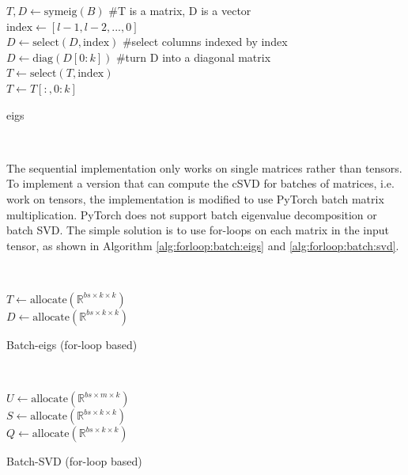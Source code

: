 \begin{algorithm}[H]
\SetAlgoLined
{}
$T,D \gets \mathrm{symeig}(B)$ \#T is a matrix, D is a vector \\
$\mathrm{index} \gets [l-1, l-2,..., 0]$ \\
$D \gets \mathrm{select}(D, \mathrm{index})$ \#select columns indexed by index \\
$D \gets \mathrm{diag}(D[0:k])$ \#turn D into a diagonal matrix \\
$T \gets \mathrm{select}(T, \mathrm{index})$ \\
$T \gets T[:,0:k]$ \\
\caption{eigs}
\label{alg:eigs}
\end{algorithm}

$ $ \newline

The sequential implementation only works on single matrices rather than tensors. To implement a version that can compute the cSVD for batches of matrices, i.e. work on tensors, the implementation is modified to use PyTorch batch matrix multiplication. PyTorch does not support batch eigenvalue decomposition or batch SVD. The simple solution is to use for-loops on each matrix in the input tensor, as shown in Algorithm \ref{alg:forloop:batch:eigs} and \ref{alg:forloop:batch:svd}.

$ $ \newline

\begin{algorithm}[H]
\label{alg:forloop:batch:eigs}
\SetAlgoLined
{}
$T \gets \mathrm{allocate}(\mathbb{R}^{bs \times k \times k})$ \\
$D \gets \mathrm{allocate}(\mathbb{R}^{bs \times k \times k})$ \\
\caption{Batch-eigs (for-loop based)}
\end{algorithm}

$ $ \newline

\begin{algorithm}[H]
  \label{alg:forloop:batch:svd}
\SetAlgoLined
{}
$U \gets \mathrm{allocate}(\mathbb{R}^{bs \times m \times k})$ \\
$S \gets \mathrm{allocate}(\mathbb{R}^{bs \times k \times k})$ \\
$Q \gets \mathrm{allocate}(\mathbb{R}^{bs \times k \times k})$ \\
\caption{Batch-SVD (for-loop based)}
\end{algorithm}


